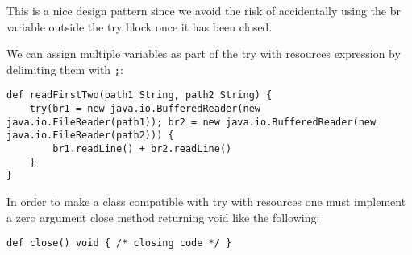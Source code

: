 \documentclass[conc-doc]{subfiles}
\begin{document}
This is a nice design pattern since we avoid the risk of accidentally using the br variable outside the try block once it has been closed.

We can assign multiple variables as part of the try with resources expression by delimiting them with \lstinline{;}:
\begin{lstlisting}
def readFirstTwo(path1 String, path2 String) {
	try(br1 = new java.io.BufferedReader(new java.io.FileReader(path1)); br2 = new java.io.BufferedReader(new java.io.FileReader(path2))) {
		br1.readLine() + br2.readLine()
	}
}
\end{lstlisting}

In order to make a class compatible with try with resources one must implement a zero argument close method returning void like the following:
\begin{lstlisting}
def close() void { /* closing code */ }
\end{lstlisting}
\end{document}
